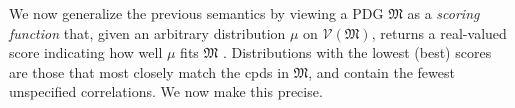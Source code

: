 \documentclass{article}
\theoremstyle{plain}
\theoremstyle{definition}
\theoremstyle{remark}
\newcommand{\V}{\mathcal V}
\newcommand{\dg}[1]{\mathfrak{#1}}
\numberwithin{equation}{section}
\begin{document}
	We now generalize the previous semantics by viewing a PDG $\dg M$ as
	a \emph{scoring function} that, given an arbitrary
        distribution $\mu$ on $\V(\dg M)$, 
	returns a real-valued score indicating how well $\mu$ fits $\dg M$%
	. Distributions with the lowest (best) scores are those that
	most closely match the cpds in $\dg M$, and contain the fewest unspecified correlations.
	We now make this precise.
\end{document}
